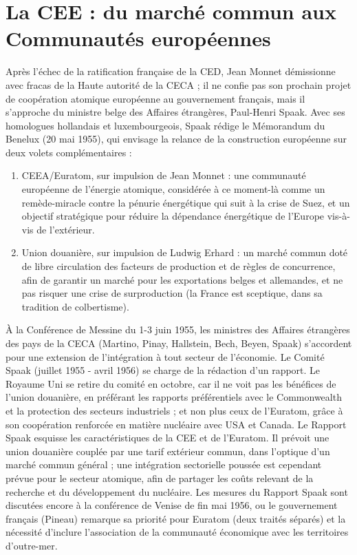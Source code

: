 \documentclass{report}%
\begin{document}
\section{La CEE : du marché commun aux Communautés européennes}
Après l’échec de la ratification française de la CED, Jean Monnet démissionne avec fracas de la Haute autorité de la CECA ; il ne confie pas son prochain projet de coopération atomique européenne au gouvernement français, mais il s’approche du ministre belge des Affaires étrangères, Paul-Henri Spaak. Avec ses homologues hollandais et luxembourgeois, Spaak rédige le Mémorandum du Benelux (20 mai 1955), qui envisage la relance de la construction européenne sur deux volets complémentaires :
	\begin{enumerate}
		\item CEEA/Euratom, sur impulsion de Jean Monnet : une communauté européenne de l’énergie atomique, considérée à ce moment-là comme un remède-miracle contre la pénurie énergétique qui suit à la crise de Suez, et un objectif stratégique pour réduire la dépendance énergétique de l’Europe vis-à-vis de l’extérieur.
		\item Union douanière, sur impulsion de Ludwig Erhard : un marché commun doté de libre circulation des facteurs de production et de règles de concurrence, afin de garantir un marché pour les exportations belges et allemandes, et ne pas risquer une crise de surproduction (la France est sceptique, dans sa tradition de colbertisme).
	\end{enumerate}
À la Conférence de Messine du 1-3 juin 1955, les ministres des Affaires étrangères des pays de la CECA (Martino, Pinay, Hallstein, Bech, Beyen, Spaak) s’accordent pour une extension de l’intégration à tout secteur de l’économie. Le Comité Spaak (juillet 1955 - avril 1956) se charge de la rédaction d’un rapport. Le Royaume Uni se retire du comité en octobre, car il ne voit pas les bénéfices de l’union douanière, en préférant les rapports préférentiels avec le Commonwealth et la protection des secteurs industriels ; et non plus ceux de l’Euratom, grâce à son coopération renforcée en matière nucléaire avec USA et Canada. Le Rapport Spaak esquisse les caractéristiques de la CEE et de l’Euratom. Il prévoit une union douanière couplée par une tarif extérieur commun, dans l’optique d’un marché commun général ; une intégration sectorielle poussée est cependant prévue pour le secteur atomique, afin de partager les coûts relevant de la recherche et du développement du nucléaire.
Les mesures du Rapport Spaak sont discutées encore à la conférence de Venise de fin mai 1956, ou le gouvernement français (Pineau) remarque sa priorité pour Euratom (deux traités séparés) et la nécessité d’inclure l’association de la communauté économique avec les territoires d’outre-mer.
\end{document}
